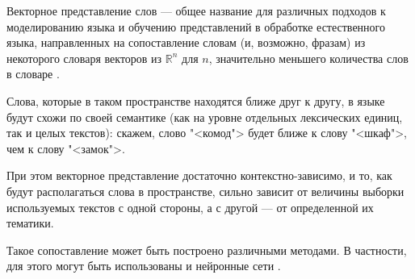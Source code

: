 \begin{defn}
    Векторное представление слов --- общее название для различных подходов к моделированию языка и обучению представлений
    в обработке естественного языка, направленных на сопоставление словам (и, возможно, фразам) из некоторого словаря
    векторов из $\mathbb{R}^{n}$ для $n$, значительно меньшего количества слов в словаре \cite{jurafsky2000speech}.
\end{defn}

Слова, которые в таком пространстве находятся ближе друг к другу, в языке будут схожи по своей семантике (как на уровне отдельных 
лексических единиц, так и целых текстов): скажем, слово "<комод"> будет ближе к слову "<шкаф">, чем к слову "<замок">.

При этом векторное представление достаточно контекстно-зависимо, и то, как будут располагаться слова в пространстве, 
сильно зависит от величины выборки используемых текстов с одной стороны, а с другой --- от определенной их тематики.

Такое сопоставление может быть построено различными методами. В частности, для этого могут быть использованы
и нейронные сети \cite{mikolov2013distributed}.